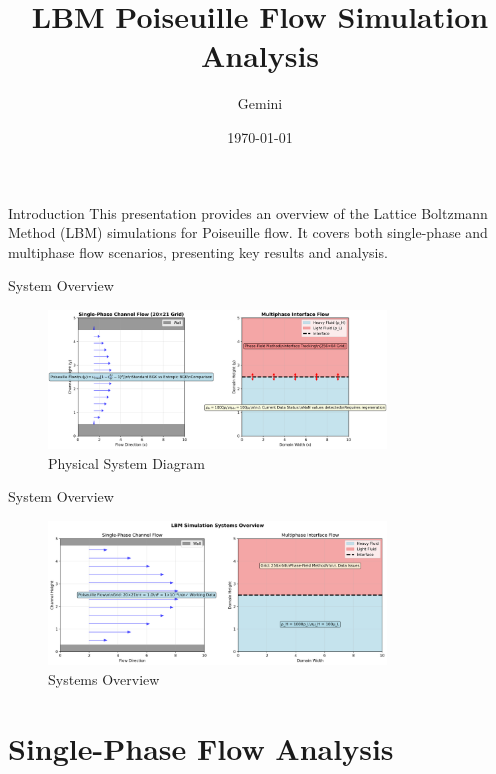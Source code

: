 \documentclass{beamer}
\title{LBM Poiseuille Flow Simulation Analysis}
\author{Gemini}
\date{\today}
\begin{document}
\begin{frame}
  \titlepage
\end{frame}

\begin{frame}{Introduction}
  This presentation provides an overview of the Lattice Boltzmann Method (LBM) simulations for Poiseuille flow. It covers both single-phase and multiphase flow scenarios, presenting key results and analysis.
\end{frame}

\begin{frame}{System Overview}
  \begin{figure}
    \includegraphics[width=0.8\textwidth]{plots/analysis/physical_system_diagram.png}
    \caption{Physical System Diagram}
  \end{figure}
\end{frame}

\begin{frame}{System Overview}
  \begin{figure}
    \includegraphics[width=0.8\textwidth]{plots/analysis/systems_overview.png}
    \caption{Systems Overview}
  \end{figure}
\end{frame}

\section{Single-Phase Flow Analysis}
\end{document}
